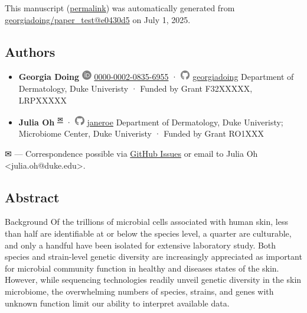 This manuscript
(\href{https://georgiadoing.github.io/paper_test/v/e0430d5da4de899c144861e386b7ec516d456c0a/}{permalink})
was automatically generated
from \href{https://github.com/georgiadoing/paper_test/tree/e0430d5da4de899c144861e386b7ec516d456c0a}{georgiadoing/paper\_test@e0430d5}
on July 1, 2025.

\hypertarget{authors}{%
\subsection{Authors}\label{authors}}

\begin{itemize}
\item
  \textbf{Georgia Doing}
  \includegraphics[width=0.16667in,height=0.16667in]{images/orcid.svg}
  \href{https://orcid.org/0000-0002-0835-6955}{0000-0002-0835-6955}
  · \includegraphics[width=0.16667in,height=0.16667in]{images/github.svg}
  \href{https://github.com/georgiadoing}{georgiadoing}
  Department of Dermatology, Duke Univeristy
  · Funded by Grant F32XXXXX, LRPXXXXX
\item
  \textbf{Julia Oh}
  \textsuperscript{\protect\hyperlink{correspondence}{✉}}
  · \includegraphics[width=0.16667in,height=0.16667in]{images/github.svg}
  \href{https://github.com/janeroe}{janeroe}
  Department of Dermatology, Duke Univeristy; Microbiome Center, Duke Univeristy
  · Funded by Grant RO1XXX
\end{itemize}

\leavevmode{}%
✉ --- Correspondence possible via \href{https://github.com/georgiadoing/paper_test/issues}{GitHub Issues}
or email to
Julia Oh \textless julia.oh@duke.edu\textgreater.

\hypertarget{abstract}{%
\subsection{Abstract}\label{abstract}}

Background Of the trillions of microbial cells associated with human skin, less than half are identifiable at or below the species level, a quarter are culturable, and only a handful have been isolated for extensive laboratory study. Both species and strain-level genetic diversity are increasingly appreciated as important for microbial community function in healthy and diseases states of the skin. However, while sequencing technologies readily unveil genetic diversity in the skin microbiome, the overwhelming numbers of species, strains, and genes with unknown function limit our ability to interpret available data.

